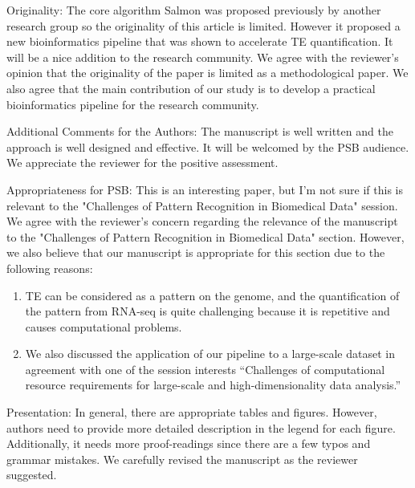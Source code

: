 \documentclass[10pt]{article}
\begin{document}
\begin{response}{Originality: The core algorithm Salmon was proposed previously by another research group so the originality of this article is limited. However it proposed a new bioinformatics pipeline that was shown to accelerate TE quantification. It will be a nice addition to the research community.}
We agree with the reviewer's opinion that the originality of the paper is limited as a methodological paper. We also agree that the main contribution of our study is to develop a practical bioinformatics pipeline for the research community. 
\end{response}

\begin{response}{Additional Comments for the Authors: The manuscript is well written and the approach is well designed and effective. It will be welcomed by the PSB audience.}
We appreciate the reviewer for the positive assessment. 
\end{response}

\begin{response}{Appropriateness for PSB: This is an interesting paper, but I’m not sure if this is relevant to the "Challenges of Pattern Recognition in Biomedical Data" session.}
We agree with the reviewer's concern regarding the relevance of the manuscript to the "Challenges of Pattern Recognition in Biomedical Data" section. However, we also believe that our manuscript is appropriate for this section due to the following reasons:

\begin{enumerate}
\item TE can be considered as a pattern on the genome, and the quantification of the pattern from RNA-seq is quite challenging because it is repetitive and causes computational problems.
\item We also discussed the application of our pipeline to a large-scale dataset
in agreement with one of the session interests 
``Challenges of computational resource requirements for large-scale and high-dimensionality data analysis.''
\end{enumerate}
\end{response}
\begin{response}{Presentation: In general, there are appropriate tables and figures. However, authors need to provide more detailed description in the legend for each figure. Additionally, it needs more proof-readings since there are a few typos and grammar mistakes.}
We carefully revised the manuscript as the reviewer suggested. 
\end{response}
\end{document}
